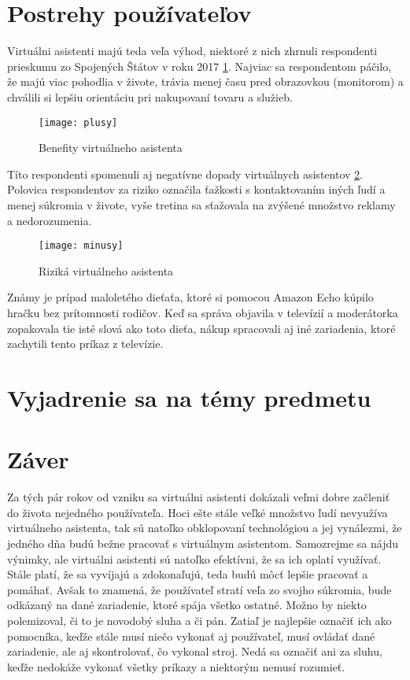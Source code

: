 \documentclass[10pt,twoside,slovak,coursepaper]{article}
\begin{document}
\section{Postrehy používateľov}
Virtuálni asistenti majú teda veľa výhod, niektoré z nich zhrnuli respondenti prieskumu zo Spojených Štátov v roku 2017 \ref{plusy}. Najviac sa respondentom páčilo, že majú viac pohodlia v živote, trávia menej času pred obrazovkou (monitorom) a chválili si lepšiu orientáciu pri nakupovaní tovaru a služieb.\cite{Nae}
\begin{figure}[H]
\centering
\texttt{[image: plusy]}
\caption{Benefity virtuálneho asistenta\cite{Nae}}
\label{plusy}
\end{figure}

Títo respondenti spomenuli aj negatívne dopady virtuálnych asistentov \ref{mínusy}. Polovica respondentov za riziko označila ťažkosti s kontaktovaním iných ľudí a menej súkromia v živote, vyše tretina sa sťažovala na zvýšené množstvo reklamy a nedorozumenia.\cite{Nae}
\begin{figure}[H]
\centering
\texttt{[image: minusy]}
\caption{Riziká virtuálneho asistenta \cite{Nae}}
\label{mínusy}
\end{figure}

Známy je prípad maloletého dieťaťa, ktoré si pomocou Amazon Echo kúpilo hračku bez prítomnosti rodičov. Keď sa správa objavila v televízií a moderátorka zopakovala tie isté slová ako toto dieťa, nákup spracovali aj iné zariadenia, ktoré zachytili tento príkaz z televízie. \cite{Nae}

\section{Vyjadrenie sa na témy predmetu}

\section{Záver}
Za tých pár rokov od vzniku sa virtuálni asistenti dokázali veľmi dobre začleniť do života nejedného používateľa. Hoci ešte stále veľké množstvo ľudí  nevyužíva virtuálneho asistenta, tak sú natoľko obklopovaní technológiou a jej vynálezmi, že jedného dňa budú bežne pracovať s virtuálnym asistentom. Samozrejme sa nájdu výnimky, ale virtuálni asistenti sú natoľko efektívni, že sa ich oplatí využívať. Stále platí, že sa vyvíjajú a zdokonaľujú, teda budú môcť lepšie pracovať a pomáhať. Avšak to znamená, že používateľ stratí veľa zo svojho súkromia, bude odkázaný na dané zariadenie, ktoré spája všetko ostatné. Možno by niekto polemizoval, či to je novodobý sluha a či pán. Zatiaľ je najlepšie označiť ich ako pomocníka, keďže stále musí niečo vykonať aj používateľ, musí ovládať dané zariadenie, ale aj skontrolovať, čo vykonal stroj. Nedá sa označiť ani za sluhu, keďže nedokáže vykonať všetky príkazy a niektorým nemusí rozumieť.



\end{document}
